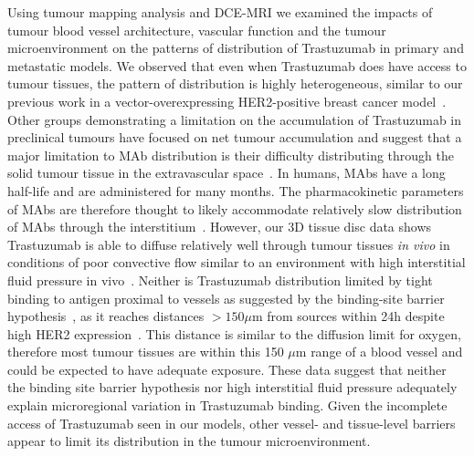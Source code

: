Using tumour mapping analysis and \acs{DCE-MRI} we examined the impacts of tumour blood vessel architecture, vascular function and the tumour microenvironment on the patterns of distribution of Trastuzumab in primary and metastatic models.
We observed that even when Trastuzumab does have access to tumour tissues, the pattern of distribution is highly heterogeneous, similar to our previous work in a vector-overexpressing \acs{HER2}-positive breast cancer model~\cite{Baker:2008ci}.
Other groups demonstrating a limitation on the accumulation of Trastuzumab in preclinical tumours have focused on net tumour accumulation and suggest that a major limitation to \acs{MAb} distribution is their difficulty distributing through the solid tumour tissue in the extravascular space~\cite{Jain:2010ie,Chauhan:2011fi,Lee:2010gb}.
In humans, \acs{MAbs} have a long half-life and are administered for many months.
The pharmacokinetic parameters of \acs{MAbs} are therefore thought to likely accommodate relatively slow distribution of \acs{MAbs} through the interstitium~\cite{Chauhan:2011fi,Thurber:2012dd}.
However, our 3D tissue disc data shows Trastuzumab is able to diffuse relatively well through tumour tissues \emph{in vivo} in conditions of poor convective flow similar to an environment with high interstitial fluid pressure in vivo~\cite{Baker:2018ex}.
Neither is Trastuzumab distribution limited by tight binding to antigen proximal to vessels as suggested by the binding-site barrier hypothesis~\cite{Juweid:1992ty}, as it reaches distances $>150 \mu$m from sources within 24h despite high \acs{HER2} expression~\cite{Baker:2018ex}.
This distance is similar to the diffusion limit for oxygen, therefore most tumour tissues are within this 150 $\mu$m range of a blood vessel and could be expected to have adequate exposure.
These data suggest that neither the binding site barrier hypothesis nor high interstitial fluid pressure adequately explain microregional variation in Trastuzumab binding.
Given the incomplete access of Trastuzumab seen in our models, other vessel- and tissue-level barriers appear to limit its distribution in the tumour microenvironment.

